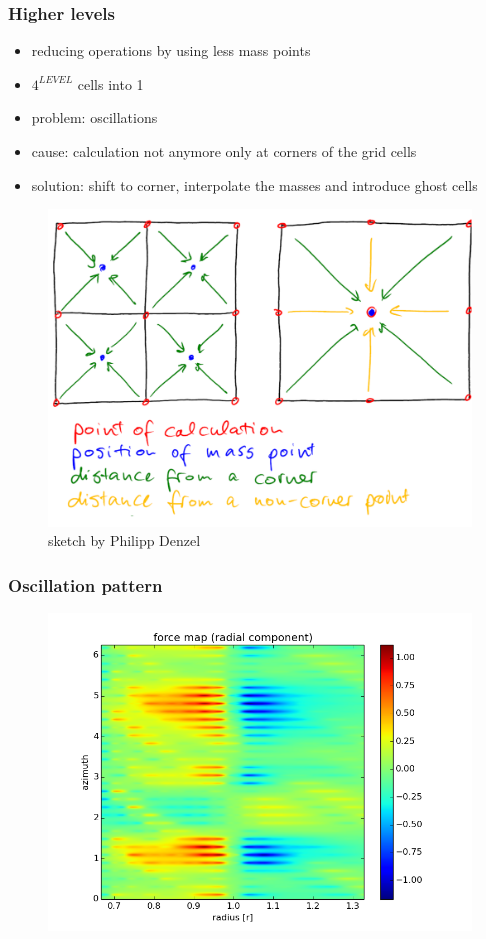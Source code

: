 \documentclass{beamer}
\begin{document}
\begin{frame}
 \frametitle{Higher levels}
 \begin{itemize}
  \item reducing operations by using less mass points 
  \item $4^{LEVEL}$ cells into 1
  \item problem: oscillations
  \item cause: calculation not anymore only at corners of the grid cells
  \item solution: shift to corner, interpolate the masses and introduce ghost cells
 \end{itemize}
 \begin{figure}[H]
  \centering
  \includegraphics[width=.49\textwidth]{reimagined_sketch1.pdf}
  \caption{sketch by Philipp Denzel}
\end{figure}
\end{frame}
\begin{frame}
 \frametitle{Oscillation pattern}
 \begin{figure}[H]
  \centering
  \includegraphics[width=.8\textwidth]{radial_force_lvl3.png}
 \end{figure} 
\end{frame}
\end{document}

